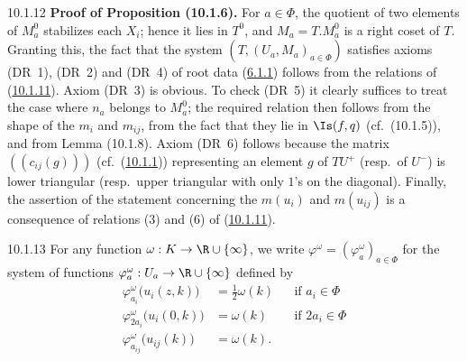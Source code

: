 \documentclass[12pt,a4paper,oneside,english]{smfart}
\makeatletter
\newcommand{\btanchor}[1]{\leavevmode\Hy@raisedlink{\hypertarget{bt:#1}{}}}
\newcommand{\btref}[1]{\hyperlink{bt:#1}{#1}}
\theoremstyle{definition}
\theoremstyle{bt}
\makeatother
\begin{document}
\num{10.1.12}\btanchor{10.1.12} \textbf{Proof of Proposition (10.1.6).}
For $a\in\Phi$, the quotient of two elements of $M^{0}_a$ stabilizes each
$X_i$; hence it lies in $T^{0}$, and $M_a=T.M^{0}_a$ is a right coset of $T$.
Granting this, the fact that the system $(T,(U_a,M_a)_{a\in\Phi})$ satisfies
axioms (DR~1), (DR~2) and (DR~4) of root data (\btref{6.1.1}) follows from the relations
of (\btref{10.1.11}). Axiom (DR~3) is obvious. To check (DR~5) it clearly suffices to
treat the case where $n_a$ belongs to $M^{0}_a$; the required relation then
follows from the shape of the $m_i$ and $m_{ij}$, from the fact that they lie in
$\Is(f,q)$ (cf.\ (10.1.5)), and from Lemma (10.1.8). Axiom (DR~6) follows
because the matrix $((c_{ij}(g)))$ (cf.\ (\btref{10.1.1})) representing an element $g$
of $TU^{+}$ (resp.\ of $U^{-}$) is lower triangular (resp.\ upper triangular
with only $1$'s on the diagonal). Finally, the assertion of the statement
concerning the $m(u_i)$ and $m(u_{ij})$ is a consequence of relations (3) and
(6) of (\btref{10.1.11}).

\num{10.1.13}\btanchor{10.1.13} For any function $\omega:K\to\R\cup\{\infty\}$, we write
$\varphi^{\omega}=(\varphi^{\omega}_a)_{a\in\Phi}$ for the system of functions
$\varphi^{\omega}_a:U_a\to\R\cup\{\infty\}$ defined by
\begin{align}
\varphi^{\omega}_{a_i}\bigl(u_i(z,k)\bigr) &=\tfrac{1}{2}\omega(k)
   &&\text{if } a_i\in\Phi \tag{1}\\
\varphi^{\omega}_{2a_i}\bigl(u_i(0,k)\bigr) &=\omega(k)
   &&\text{if } 2a_i\in\Phi \tag{2}\\
\varphi^{\omega}_{a_{ij}}\bigl(u_{ij}(k)\bigr) &=\omega(k). \tag{3}
\end{align}
\end{document}
